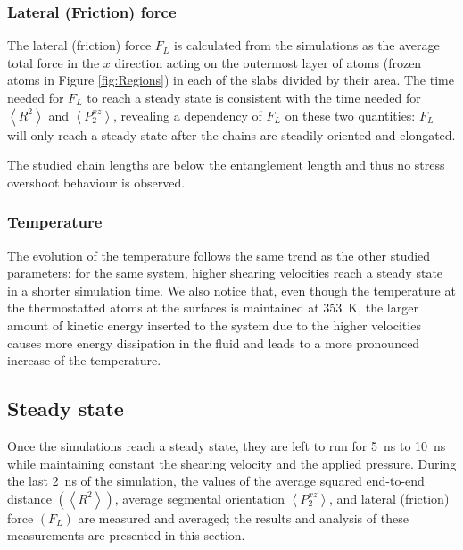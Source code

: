 \documentclass[aps,prb,reprint,superscriptaddress, a4paper]{revtex4-1}
\begin{document}
\subsubsection{Lateral (Friction) force}

The lateral (friction) force $F_L$ is calculated from the simulations as the average total force in the $x$ direction acting on the outermost layer of atoms (frozen atoms in Figure \ref{fig:Regions}) in each of the slabs divided by their area. The time needed for $F_L$  to reach a steady state is consistent with the time  needed for $\left< R^2 \right> $ and $\left<P_{2}^{xz} \right> $, revealing a dependency of $F_L$ on these two quantities: $F_L$ will only reach a steady state after the chains are steadily oriented and elongated.

The studied chain lengths are below the entanglement length and thus no stress overshoot behaviour is observed\cite{Jeong2017}.


\subsubsection{Temperature}

The evolution of the temperature follows the same trend as the other studied parameters: for the same system,  higher shearing velocities reach a steady state in a shorter simulation time. We also notice that, even though the temperature at the thermostatted atoms at the surfaces is maintained at  \SI{353}{\kelvin}, the larger amount of kinetic energy inserted to the system due to the higher velocities causes more energy dissipation in the fluid and leads to a more pronounced increase of the  temperature.


\subsection{Steady state}

Once the simulations reach a steady state, they are left to run for  \SI{5}{\nano\second} to  \SI{10}{\nano\second}  while maintaining constant the shearing velocity and the applied pressure. During the last  \SI{2}{\nano\second} of the simulation, the values of the average squared end-to-end distance $\left(\left< R^2 \right> \right)$,   average segmental orientation $\left<P_{2}^{xz} \right> $, and lateral (friction) force $\left(F_L\right)$ are measured and averaged; the results and analysis of these measurements are presented in this section.   
\end{document}
